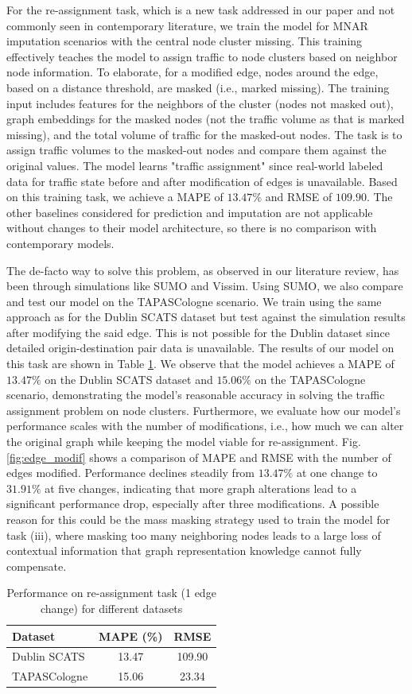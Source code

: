 For the re-assignment task, which is a new task addressed in our paper and not commonly seen in contemporary literature, we train the model for MNAR imputation scenarios with the central node cluster missing. This training effectively teaches the model to assign traffic to node clusters based on neighbor node information. To elaborate, for a modified edge, nodes around the edge, based on a distance threshold, are masked (i.e., marked missing). The training input includes features for the neighbors of the cluster (nodes not masked out), graph embeddings for the masked nodes (not the traffic volume as that is marked missing), and the total volume of traffic for the masked-out nodes. The task is to assign traffic volumes to the masked-out nodes and compare them against the original values. The model learns "traffic assignment" since real-world labeled data for traffic state before and after modification of edges is unavailable. Based on this training task, we achieve a MAPE of $13.47\%$ and RMSE of $109.90$. The other baselines considered for prediction and imputation are not applicable without changes to their model architecture, so there is no comparison with contemporary models.

The de-facto way to solve this problem, as observed in our literature review, has been through simulations like SUMO\cite{sumo} and Vissim\cite{vissim}. Using SUMO, we also compare and test our model on the TAPASCologne scenario. We train using the same approach as for the Dublin SCATS dataset but test against the simulation results after modifying the said edge. This is not possible for the Dublin dataset since detailed origin-destination pair data is unavailable. The results of our model on this task are shown in Table \ref{reassign_table}. We observe that the model achieves a MAPE of $13.47\%$ on the Dublin SCATS dataset and $15.06\%$ on the TAPASCologne scenario, demonstrating the model's reasonable accuracy in solving the traffic assignment problem on node clusters. Furthermore, we evaluate how our model's performance scales with the number of modifications, i.e., how much we can alter the original graph while keeping the model viable for re-assignment. Fig. \ref{fig:edge_modif} shows a comparison of MAPE and RMSE with the number of edges modified. Performance declines steadily from $13.47\%$ at one change to $31.91\%$ at five changes, indicating that more graph alterations lead to a significant performance drop, especially after three modifications. A possible reason for this could be the mass masking strategy used to train the model for task (iii), where masking too many neighboring nodes leads to a large loss of contextual information that graph representation knowledge cannot fully compensate.

\begin{table}[]
\centering
\caption{Performance on re-assignment task (1 edge change) for different datasets}
\label{reassign_table}
\begin{tabular}{lcc}
\toprule
Dataset & MAPE (\%) & RMSE \\
\midrule
Dublin SCATS & 13.47 & 109.90 \\
TAPASCologne & 15.06 & 23.34 \\
\bottomrule
\end{tabular}
\end{table}